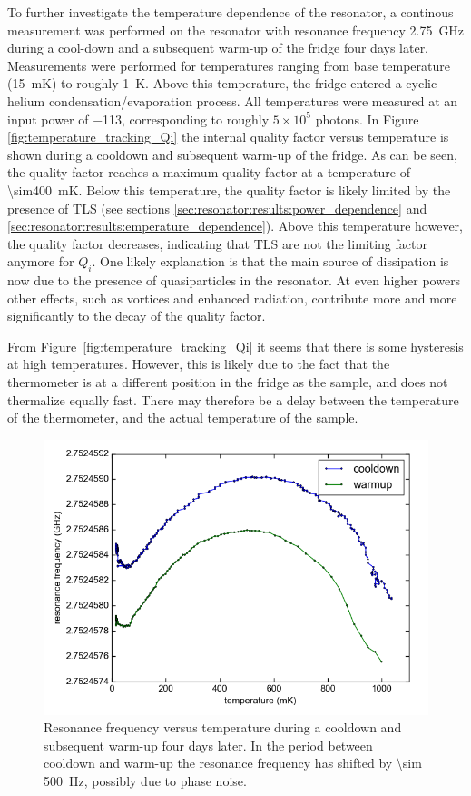 \documentclass[12pt]{report}
\begin{document}
To further investigate the temperature dependence of the resonator, a continous measurement was performed on the resonator with resonance frequency \SI{2.75}{\giga \hertz} during a cool-down and a subsequent warm-up of the fridge four days later. Measurements were performed for temperatures ranging from base temperature (\SI{15}{\milli \kelvin}) to roughly \SI{1}{\kelvin}. Above this temperature, the fridge entered a cyclic helium condensation/evaporation process. All temperatures were measured at an input power of \SI{-113}{\dBm}, corresponding to roughly $5 \times 10^5$ photons. In Figure \ref{fig:temperature_tracking_Qi} the internal quality factor versus temperature is shown during a cooldown and subsequent warm-up of the fridge. As can be seen, the quality factor reaches a maximum quality factor at a temperature of \SI{\sim400}{\milli \kelvin}. Below this temperature, the quality factor is likely limited by the presence of TLS (see sections \ref{sec:resonator:results:power_dependence} and \ref{sec:resonator:results:emperature_dependence}). Above this temperature however, the quality factor decreases, indicating that TLS are not the limiting factor anymore for $Q_i$. One likely explanation is that the main source of dissipation is now due to the presence of quasiparticles in the resonator. At even higher powers other effects, such as vortices and enhanced radiation, contribute more and more significantly to the decay of the quality factor.

From Figure~\ref{fig:temperature_tracking_Qi} it seems that there is some hysteresis at high temperatures. However, this is likely due to the fact that the thermometer is at a different position in the fridge as the sample, and does not thermalize equally fast. There may therefore be a delay between the temperature of the thermometer, and the actual temperature of the sample.

\begin{figure}[h!]
    \centering
    \includegraphics[width=.72\textwidth]{Figures/Temperature tracking - f0 vs T.png}
    \caption{Resonance frequency versus temperature during a cooldown and subsequent warm-up four days later. In the period between cooldown and warm-up the resonance frequency has shifted by \SI{\sim 500}{\hertz}, possibly due to phase noise.}
    \label{fig:temperature_tracking_f0}
\end{figure}
\end{document}

